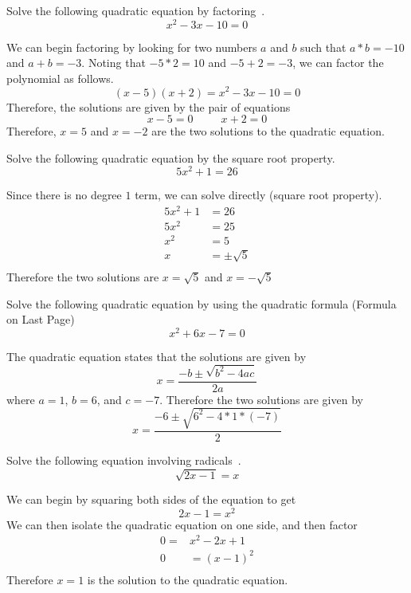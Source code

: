 \documentclass[addpoints,12pt]{exam}
\begin{document}
\begin{questions}
\question Solve the following quadratic equation by factoring~. 
\[
	x^{2}-3x-10=0 
\]

\begin{solution}
    We can begin factoring by looking for two numbers $a$ and $b$ such that $a*b = -10$ and $a+b = -3$. Noting that $-5*2=10$ and $-5+2 = -3$, we can factor the polynomial as follows.  
		\[
			(x-5)(x+2) = x^{2}-3x-10 = 0 
		\]
		Therefore, the solutions are given by the pair of equations 
		\[
		x-5 = 0 \hspace{30pt} x+2 = 0 
		\]
		Therefore, $x=5$ and $x=-2$ are the two solutions to the quadratic equation. 
\end{solution}

\question Solve the following quadratic equation by the square root property. 
   \[
   5x^{2}+1=26
   \]

	 \begin{solution}
	     Since there is no degree $1$ term, we can solve directly (square root property). 
			 \begin{align*}
				 5x^{2}+1 & = 26 \\
				 5x^{2} & = 25 \\
				 x^{2} & = 5 \\
				 x & = \pm \sqrt{5}\\
			 \end{align*}
			 Therefore the two solutions are $x = \sqrt{5}$ and $x = -\sqrt{5}$
	 \end{solution}
\question Solve the following quadratic equation by using the quadratic formula (Formula on Last Page)
   \[
x^{2}+6x-7=0
\]

\begin{solution}
    The quadratic equation states that the solutions are given by 
		\[
		x = \frac{-b\pm \sqrt{b^{2}-4ac}}{2a}
		\]
		where $a = 1$, $b = 6$, and $c = -7$. Therefore the two solutions are given by 
		\[
		x = \frac{-6\pm \sqrt{6^{2}-4*1*(-7)}}{2}
		\]
\end{solution}
\question Solve the following equation involving radicals~.
   \[
    \sqrt{2x-1}=x
	 \]
\begin{solution}
    We can begin by squaring both sides of the equation to get 
		\[
		2x-1 = x^{2}
		\]
		We can then isolate the quadratic equation on one side, and then factor 
	\begin{align*}
	    0 = & x^{2}-2x+1 \\
			0 & = (x-1)^{2} \\
	\end{align*}
	Therefore $x=1$ is the solution to the quadratic equation.
\end{solution}
	     


\end{questions}
\end{document}
